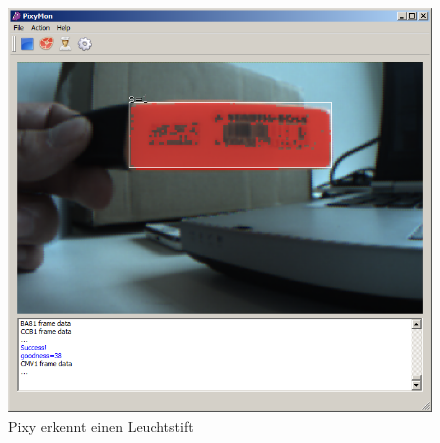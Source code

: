 \begin{figure}[h!]
\centering
\includegraphics[width=0.7\linewidth]{../../fig/pixy_objekt}
\caption{Pixy erkennt einen Leuchtstift}
\label{fig:pixy_objekt}
\end{figure}



